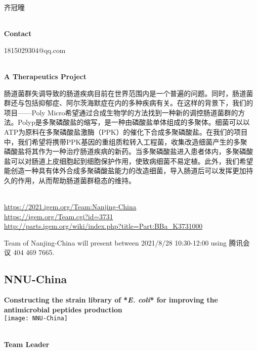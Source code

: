   齐冠曈


\textbf{\\Contact}

  1815029304@qq.com


\textbf{\\A Therapeutics Project\\}\begin{spacing}{1.5}

肠道菌群失调导致的肠道疾病目前在世界范围内是一个普遍的问题。同时，肠道菌群还与包括抑郁症、阿尔茨海默症在内的多种疾病有关。在这样的背景下，我们的项目——Poly Micro希望通过合成生物学的方法找到一种新的调控肠道菌群的方法。Polyp是多聚磷酸盐的缩写，是一种由磷酸盐单体组成的多聚体。细菌可以以ATP为原料在多聚磷酸盐激酶（PPK）的催化下合成多聚磷酸盐。在我们的项目中，我们希望将携带PPK基因的重组质粒转入工程菌，收集改造细菌产生的多聚磷酸盐将其作为一种治疗肠道疾病的新药。当多聚磷酸盐进入患者体内，多聚磷酸盐可以对肠道上皮细胞起到细胞保护作用，使致病细菌不易定植。此外，我们希望能创造一种具有体外合成多聚磷酸盐能力的改造细菌，导入肠道后可以发挥更加持久的作用，从而帮助肠道菌群稳态的维持。\end{spacing}
\\

\url{https://2021.igem.org/Team:Nanjing-China }\\
\url{https://igem.org/Team.cgi?id=3731 }\\
\url{http://parts.igem.org/wiki/index.php?title=Part:BBa_K3731000 }\\


\vfill{}









Team of Nanjing-China will present between     2021/8/28 10:30-12:00    using 腾讯会议 404 469 7665.
\newpage


\subsection{\textcolor{Blu}{ NNU-China } }
\vspace{5mm}
\begin{center}
\large{
  \textbf{ Constructing the strain library of *\textit{E. coli}* for improving the antimicrobial peptides production }\\

  \texttt{[image: NNU-China]}
}
\end{center}
\textbf{\\Team Leader}

